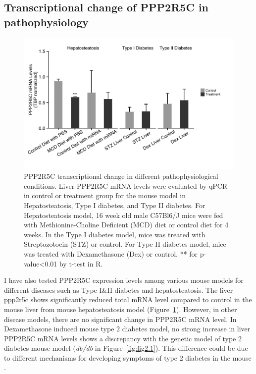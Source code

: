 \subsection{Transcriptional change of PPP2R5C in pathophysiology}

\begin{figure}[!tb]
\centering
\includegraphics[width=1\textwidth]{figs/fig2-4 liver 34sample ppp2r5c.pdf}
\caption[PPP2R5C mRNA levels in Type I\&II Diabetes or Hepatosteatosis]{\footnotesize PPP2R5C transcriptional change in different pathophysiological conditions. Liver PPP2R5C mRNA levels were evaluated by qPCR in control or treatment group for the mouse model in Hepatosteatosis, Type I diabetes, and Type II diabetes. For Hepatosteatosis model, 16 week old male C57Bl6/J mice were fed with Methionine-Choline Deficient (MCD) diet or control diet for 4 weeks. In the Type I diabetes model, mice was treated with Streptozotocin (STZ) or control. For Type II diabetes model, mice was treated with Dexamethasone (Dex) or control. ** for p-value<0.01 by t-test in R.}
\label{fig:fig2.4}
\end{figure}

I have also tested PPP2R5C expression levels among various mouse models for different diseases such as Type I\&II diabetes and hepatosteatosis. The liver \gls{ppp2r5c} shows significantly reduced total mRNA level compared to control in the mouse liver from mouse hepatosteatosis model (Figure~\ref{fig:fig2.4}). However, in other disease models, there are no significant change in PPP2R5C mRNA level. In Dexamethasone induced mouse type 2 diabetes model, no strong increase in liver PPP2R5C mRNA levels shows a discrepancy with the genetic model of type 2 diabetes mouse model (\textit{db/db} in Figure~\ref{fig:fig2.1}). This difference could be due to different mechanisms for developing symptoms of type 2 diabetes in the mouse \cite{severino_low-dose_2002,king_use_2012}.  

